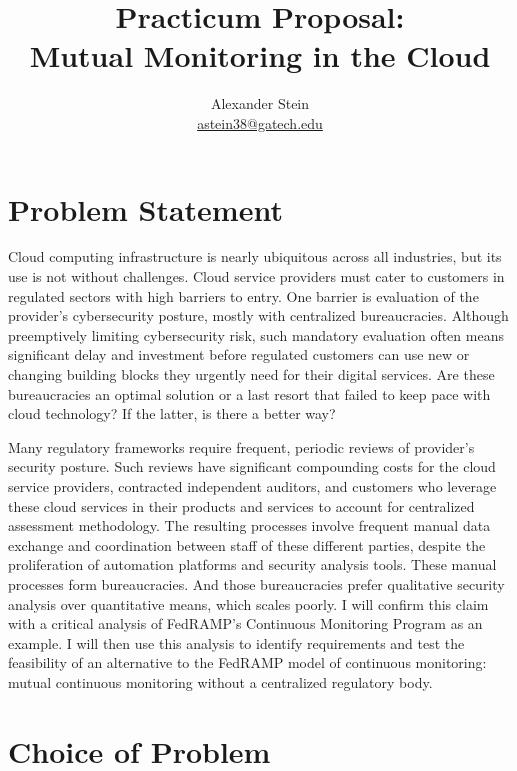 \documentclass{jdf}
\begin{document}
\title{Practicum Proposal: \\ Mutual Monitoring in the Cloud}
\author{Alexander Stein \\ \href{mailto:astein38@gatech.edu}{astein38@gatech.edu}}

\maketitle
\thispagestyle{fancy}

\section{Problem Statement}

Cloud computing infrastructure is nearly ubiquitous across all industries, but its use is not without challenges. Cloud service providers must cater to customers in regulated sectors with high barriers to entry. One barrier is evaluation of the provider's cybersecurity posture, mostly with centralized bureaucracies. Although preemptively limiting cybersecurity risk, such mandatory evaluation often means significant delay and investment before regulated customers can use new or changing building blocks they urgently need for their digital services. Are these bureaucracies an optimal solution or a last resort that failed to keep pace with cloud technology? If the latter, is there a better way?

Many regulatory frameworks require frequent, periodic reviews of provider's security posture. Such reviews have significant compounding costs for the cloud service providers, contracted independent auditors, and customers who leverage these cloud services in their products and services to account for centralized assessment methodology. The resulting processes involve frequent manual data exchange and coordination between staff of these different parties, despite the proliferation of automation platforms and security analysis tools. These manual processes form bureaucracies. And those bureaucracies prefer qualitative security analysis over quantitative means, which scales poorly. I will confirm this claim with a critical analysis of FedRAMP's Continuous Monitoring Program \citeyear[p.~14]{fedramp_auth_playbook25} as an example. I will then use this analysis to identify requirements and test the feasibility of an alternative to the FedRAMP model of continuous monitoring: mutual continuous monitoring without a centralized regulatory body.

\section{Choice of Problem}
\end{document}
